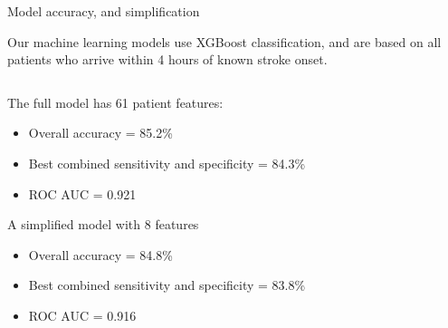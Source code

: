 \documentclass[xcolor={usenames,dvipsnames}]{beamer}
\begin{document}

\begin{frame}{Model accuracy, and simplification}

Our machine learning models use XGBoost classification, and are based on all patients who arrive within 4 hours of known stroke onset.

\vspace{5mm}

\begin{columns}[T] %

    \begin{column}{0.5\textwidth}
    
        The full model has 61 patient features:
        
        \begin{footnotesize}
        \begin{itemize}
            \item Overall accuracy = 85.2\%
            \item Best combined sensitivity and specificity = 84.3\%
            \item ROC AUC = 0.921
        \end{itemize}
        \end{footnotesize}
        
        \vspace{3mm}
        
        A simplified model with 8 features
        
        \begin{footnotesize}
        \begin{itemize}
            \item Overall accuracy = 84.8\%
            \item Best combined sensitivity and specificity = 83.8\%
            \item ROC AUC = 0.916
        \end{itemize}
        \end{footnotesize}
    \end{column}
    

\end{columns}
\end{frame}
\end{document}
